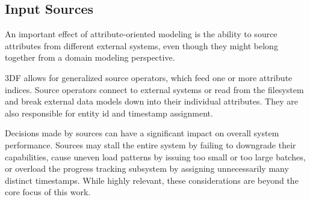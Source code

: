 \documentclass[../index.tex]{subfiles}
\begin{document}
\subsection{Input Sources}

An important effect of attribute-oriented modeling is the ability to
source attributes from different external systems, even though they
might belong together from a domain modeling perspective.

3DF allows for generalized source operators, which feed one or more
attribute indices. Source operators connect to external systems or
read from the filesystem and break external data models down into
their individual attributes. They are also responsible for entity id
and timestamp assignment.

Decisions made by sources can have a significant impact on overall
system performance. Sources may stall the entire system by failing to
downgrade their capabilities, cause uneven load patterns by issuing
too small or too large batches, or overload the progress tracking
subsystem by assigning unnecessarily many distinct timestamps. While
highly relevant, these considerations are beyond the core focus of
this work.
\end{document}
